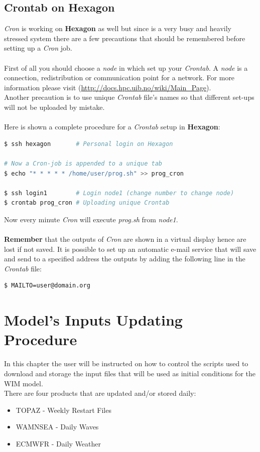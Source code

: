 \documentclass[12pt,a4paper]{report}
\begin{document}
\section{Crontab on Hexagon}
\textit{Cron} is working on \textbf{Hexagon} as well but since is a very busy and heavily stressed system there are a few precautions that should be remembered before setting up a \textit{Cron} job. \\ \\
First of all you should choose a \textit{node} in which set up your \textit{Crontab}. A \textit{node} is a connection, redistribution or communication point for a network. For more information please visit (\url{http://docs.hpc.uib.no/wiki/Main_Page}). \\
Another precaution is to use unique \textit{Crontab} file's names so that different set-ups will not be uploaded by mistake. \\ \\
Here is shown a complete procedure for a \textit{Crontab} setup in \textbf{Hexagon}: \\
\begin{lstlisting}[language=bash]
$ ssh hexagon		# Personal login on Hexagon

# Now a Cron-job is appended to a unique tab 
$ echo "* * * * * /home/user/prog.sh" >> prog_cron

$ ssh login1		# Login node1 (change number to change node)
$ crontab prog_cron	# Uploading unique Crontab
\end{lstlisting}
Now every minute \textit{Cron} will execute \textit{prog.sh} from \textit{node1}. \\ \\
\textbf{Remember} that the outputs of \textit{Cron} are shown in a virtual display hence are lost if not saved. It is possible to set up an automatic e-mail service that will save and send to a specified address the outputs by adding the following line in the \textit{Crontab} file:
\begin{lstlisting}[language=bash]
$ MAILTO=user@domain.org
\end{lstlisting}


\chapter{Model's Inputs Updating Procedure}

%


In this chapter the user will be instructed on how to control the scripts used to download and storage the input files that will be used as initial conditions for the WIM model.\\
There are four products that are updated and/or stored daily:
\begin{itemize}
\item TOPAZ - Weekly Restart Files
\item WAMNSEA - Daily Waves 
\item ECMWFR - Daily Weather
\end{itemize}
\end{document}

